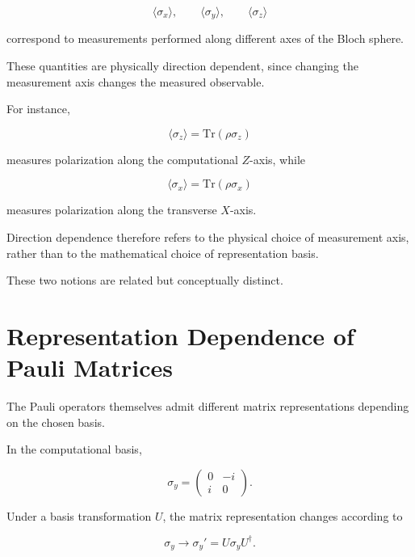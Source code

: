 \[
\langle \sigma_x \rangle,
\qquad
\langle \sigma_y \rangle,
\qquad
\langle \sigma_z \rangle
\]

correspond to measurements performed along different axes of the Bloch sphere.

These quantities are physically direction dependent, since changing the measurement axis changes the measured observable.

\medskip

For instance,

\[
\langle \sigma_z \rangle
=
\mathrm{Tr}(\rho \sigma_z)
\]

measures polarization along the computational \( Z \)-axis, while

\[
\langle \sigma_x \rangle
=
\mathrm{Tr}(\rho \sigma_x)
\]

measures polarization along the transverse \( X \)-axis.

\medskip

Direction dependence therefore refers to the physical choice of measurement axis, rather than to the mathematical choice of representation basis.

These two notions are related but conceptually distinct.


\section*{Representation Dependence of Pauli Matrices}

The Pauli operators themselves admit different matrix representations depending on the chosen basis.

In the computational basis,

\begin{equation}
\sigma_y
=
\begin{pmatrix}
0 & -i \\
i & 0
\end{pmatrix}.
\label{eq:sigma_y_computational}
\end{equation}

Under a basis transformation \( U \), the matrix representation changes according to

\begin{equation}
\sigma_y
\rightarrow
\sigma_y'
=
U \sigma_y U^\dagger.
\label{eq:sigma_y_basis_change}
\end{equation}

